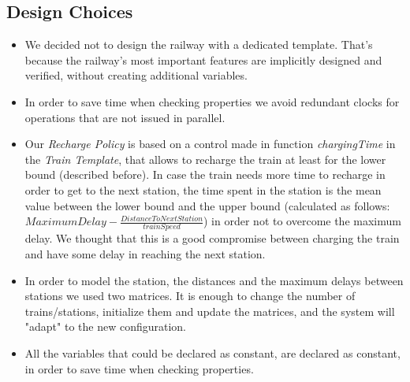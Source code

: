\bigskip

\subsection{Design Choices}
\begin{itemize}
    \item We decided not to design the railway with a dedicated template. That's because the railway's most important features
    are implicitly designed and verified, without creating additional variables.
    \item In order to save time when checking properties we avoid redundant clocks for operations that are not issued in parallel.
    \item Our \emph{Recharge Policy} is based on a control made in function \textit{chargingTime} in the \textit{Train Template},
    that allows to recharge the train at least for the lower bound (described before). In case the train needs more time to 
    recharge in order to get to the next station, the time spent in the station is the mean value between the lower bound
    and the upper bound (calculated as follows: $MaximumDelay-\frac{DistanceToNextStation}{trainSpeed}$) in order not 
    to overcome the maximum delay. We thought that this is a good compromise between charging the train and have some delay 
    in reaching the next station.
    \item In order to model the station, the distances and the maximum delays between stations we used two matrices. It is enough 
    to change the number of trains/stations, initialize them and update the matrices, and the system will "adapt" to the 
    new configuration.
    \item All the variables that could be declared as constant, are declared as constant, in order to save time when checking properties.
\end{itemize}


